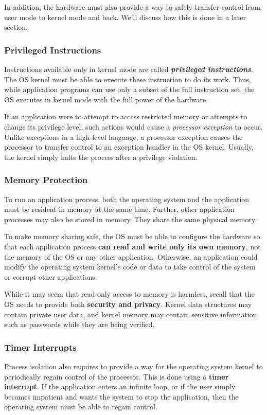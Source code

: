 \documentclass{article}
\begin{document}
In addition, the hardware must also provide a way to safely transfer control from user mode to kernel mode and back. We'll discuss how this is done in a later section.
\subsubsection{Privileged Instructions}
Instructions available only in kernel mode are called \textbf{\textit{privileged instructions}}. The OS kernel must be able to execute these instruction to do its work. Thus, while application programs can use only a subset of the full instruction set, the OS executes in kernel mode with the full power of the hardware.

If an application were to attempt to access restricted memory or attempts to change its privilege level, such actions would cause a \textit{processor exception} to occur. Unlike exceptions in a high-level language, a processor exception causes the processor to transfer control to an exception handler in the OS kernel. Usually, the kernel simply halts the process after a privilege violation.



\subsubsection{Memory Protection}
To run an application process, both the operating system and the application must be resident in memory at the same time. Further, other application processes may also be stored in memory. They share the same physical memory.

To make memory sharing safe, the OS must be able to configure the hardware so that each application process \textbf{can read and write only its own memory}, not the memory of the OS or any other application. Otherwise, an application could modify the operating system kernel's code or data to take control of the system or corrupt other applications.

While it may seem that read-only access to memory is harmless, recall that the OS needs to provide both \textbf{security and privacy}. Kernel data structures may contain private user data, and kernel memory may contain sensitive information such as passwords while they are being verified.


\subsubsection{Timer Interrupts}
Process isolation also requires to provide a way for the operating system kernel to periodically regain control of the processor. This is done using a \textbf{timer interrupt}. If the application enters an infinite loop, or if the user simply becomes impatient and wants the system to stop the application, then the operating system must be able to regain control.
\end{document}
